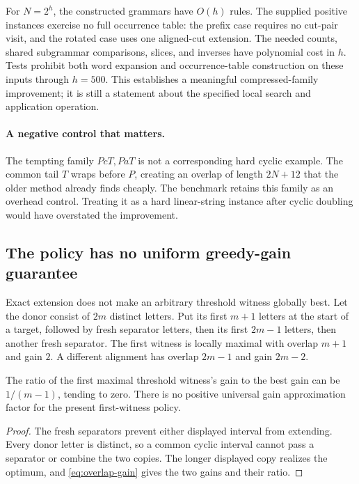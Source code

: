 For $N=2^h$, the constructed grammars have $O(h)$ rules. The supplied
positive instances exercise no full occurrence table: the prefix case
requires no cut-pair visit, and the rotated case uses one aligned-cut
extension. The needed counts, shared subgrammar comparisons, slices, and
inverses have polynomial cost in $h$. Tests prohibit both word expansion
and occurrence-table construction on these inputs through $h=500$. This
establishes a meaningful compressed-family improvement; it is still a
statement about the specified local search and application operation.

\paragraph{A negative control that matters.}
The tempting family $PcT,PaT$ is not a corresponding hard cyclic example.
The common tail $T$ wraps before $P$, creating an overlap of length
$2N+12$ that the older method already finds cheaply. The benchmark retains
this family as an overhead control. Treating it as a hard linear-string
instance after cyclic doubling would have overstated the improvement.

\subsection{The policy has no uniform greedy-gain guarantee}

Exact extension does not make an arbitrary threshold witness globally best.
Let the donor consist of $2m$ distinct letters. Put its first $m+1$ letters
at the start of a target, followed by fresh separator letters, then its
first $2m-1$ letters, then another fresh separator. The first witness is
locally maximal with overlap $m+1$ and gain $2$. A different alignment has
overlap $2m-1$ and gain $2m-2$.

\begin{proposition}
The ratio of the first maximal threshold witness's gain to the best gain
can be $1/(m-1)$, tending to zero. There is no positive universal gain
approximation factor for the present first-witness policy.
\end{proposition}
\begin{proof}
The fresh separators prevent either displayed interval from extending.
Every donor letter is distinct, so a common cyclic interval cannot pass a
separator or combine the two copies. The longer displayed copy realizes
the optimum, and \eqref{eq:overlap-gain} gives the two gains and their ratio.
\end{proof}

